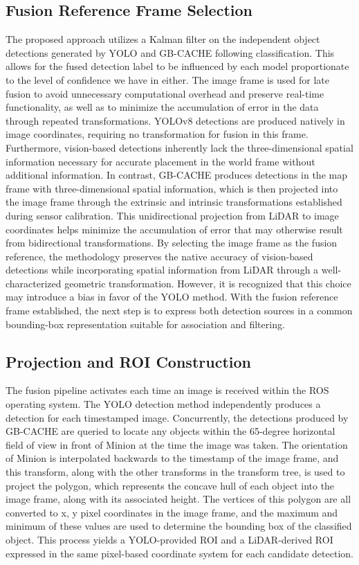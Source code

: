 \documentclass{erauthesis}
\begin{document}
\subsection{Fusion Reference Frame Selection}
The proposed approach utilizes a Kalman filter on the independent object detections generated by YOLO and GB-CACHE following classification.
This allows for the fused detection label to be influenced by each model proportionate to the level of confidence we have in either.
The image frame is used for late fusion to avoid unnecessary computational overhead and preserve real-time functionality, as well as to minimize the accumulation of error in the data through repeated transformations.
YOLOv8 detections are produced natively in image coordinates, requiring no transformation for fusion in this frame. 
Furthermore, vision-based detections inherently lack the three-dimensional spatial information necessary for accurate placement in the world frame without additional information.
In contrast, GB-CACHE produces detections in the map frame with three-dimensional spatial information, which is then projected into the image frame through the extrinsic and intrinsic transformations established during sensor calibration. 
This unidirectional projection from LiDAR to image coordinates helps minimize the accumulation of error that may otherwise result from bidirectional transformations. 
By selecting the image frame as the fusion reference, the methodology preserves the native accuracy of vision-based detections while incorporating spatial information from LiDAR through a well-characterized geometric transformation.
However, it is recognized that this choice may introduce a bias in favor of the YOLO method.
With the fusion reference frame established, the next step is to express both detection sources in a common bounding-box representation suitable for association and filtering.

\subsection{Projection and ROI Construction}

The fusion pipeline activates each time an image is received within the ROS operating system. The YOLO detection method independently produces a detection for each timestamped image. Concurrently, the detections produced by GB-CACHE are queried to locate any objects within the 65-degree horizontal field of view in front of Minion at the time the image was taken. The orientation of Minion is interpolated backwards to the timestamp of the image frame, and this transform, along with the other transforms in the transform tree, is used to project the polygon, which represents the concave hull of each object into the image frame, along with its associated height. The vertices of this polygon are all converted to x, y pixel coordinates in the image frame, and the maximum and minimum of these values are used to determine the bounding box of the classified object. 
This process yields a YOLO-provided ROI and a LiDAR-derived ROI expressed in the same pixel-based coordinate system for each candidate detection.
\end{document}

